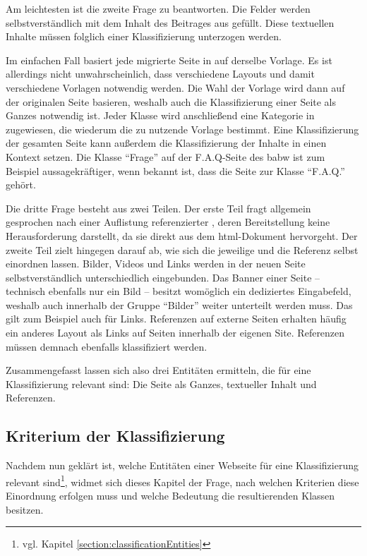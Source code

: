         Am leichtesten ist die zweite Frage zu beantworten.
        Die Felder werden selbstverständlich mit dem Inhalt des Beitrages
        aus {\wordpress} gefüllt.
        Diese textuellen Inhalte müssen folglich einer Klassifizierung unterzogen werden.
        
        Im einfachen Fall basiert jede migrierte Seite in {\imperia} auf derselbe Vorlage.
        Es ist allerdings nicht unwahrscheinlich,
        dass verschiedene Layouts und damit verschiedene Vorlagen
        notwendig werden.
        Die Wahl der Vorlage wird dann auf der originalen Seite basieren,
        weshalb auch die Klassifizierung einer Seite als Ganzes notwendig ist.
        Jeder Klasse wird anschließend eine Kategorie in {\imperia}
        zugewiesen, die wiederum die zu nutzende Vorlage bestimmt.
        Eine Klassifizierung der gesamten Seite kann außerdem die
        Klassifizierung der Inhalte in einen Kontext setzen.
        Die Klasse "`Frage"' auf der F.A.Q-Seite des \gls{babw}
        ist zum Beispiel aussagekräftiger, wenn bekannt ist,
        dass die Seite zur Klasse "`F.A.Q."' gehört.

        Die dritte Frage besteht aus zwei Teilen.
        Der erste Teil fragt allgemein gesprochen nach einer Auflistung referenzierter {\resources},
        deren Bereitstellung keine Herausforderung darstellt,
        da sie direkt aus dem \gls{html}-Dokument hervorgeht.
        Der zweite Teil zielt hingegen darauf ab,
        wie sich die jeweilige {\resource} und die Referenz selbst einordnen lassen.
        Bilder, Videos und Links werden in der neuen Seite selbstverständlich
        unterschiedlich eingebunden.
        Das Banner einer Seite -- technisch ebenfalls nur ein Bild --
        besitzt womöglich ein dediziertes Eingabefeld,
        weshalb auch innerhalb der Gruppe "`Bilder"' weiter unterteilt werden muss.
        Das gilt zum Beispiel auch für Links.
        Referenzen auf externe Seiten erhalten häufig ein anderes Layout als Links
        auf Seiten innerhalb der eigenen Site.
        Referenzen müssen demnach ebenfalls klassifiziert werden.

        Zusammengefasst lassen sich also drei Entitäten ermitteln,
        die für eine Klassifizierung relevant sind:
        Die Seite als Ganzes, textueller Inhalt und Referenzen.

    \subsection{Kriterium der Klassifizierung}
        Nachdem nun geklärt ist, welche Entitäten einer Webseite für
        eine Klassifizierung relevant sind\footnote{vgl. Kapitel \ref{section:classificationEntities}},
        widmet sich dieses Kapitel der Frage, nach welchen
        Kriterien diese Einordnung erfolgen muss
        und welche Bedeutung die resultierenden Klassen besitzen.


